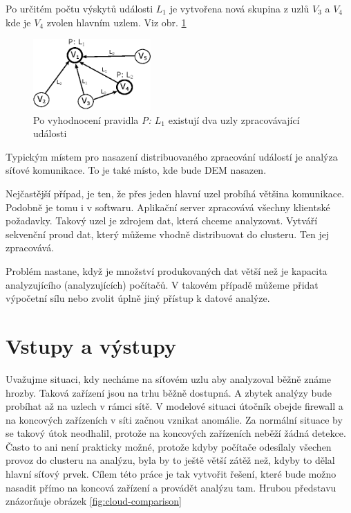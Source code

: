 \documentclass[
  digital, %
  table,   %
  nolof,     %
  nolot,     %
  oneside, %
  nocover,
  monochrome,
  12pt
]{fithesis3}
\begin{document}
Po určitém počtu výskytů události \textit{$L_1$} je vytvořena nová skupina z uzlů \textit{$V_3$} a \textit{$V_4$} kde je \textit{$V_4$} zvolen hlavním uzlem. Viz obr. \ref{fig:analysis_case_2}

\begin{figure}[H]
	\centering
    \includegraphics[width=0.4\textwidth, height=0.15\textheight]{images/analysis_case_2.eps}
    \caption{Po vyhodnocení pravidla \textit{P: $L_1$} existují dva uzly zpracovávající události}
    \label{fig:analysis_case_2}
\end{figure}

Typickým místem pro nasazení distribuovaného zpracování událostí je analýza síťové komunikace. To je také místo, kde bude DEM nasazen.

Nejčastější případ, je ten, že přes jeden hlavní uzel probíhá většina komunikace. Podobně je tomu i v softwaru. Aplikační server zpracovává všechny klientské požadavky. Takový uzel je zdrojem dat, která chceme analyzovat. Vytváří sekvenční proud dat, který můžeme vhodně distribuovat do clusteru. Ten jej zpracovává.

Problém nastane, když je množství produkovaných dat větší než je kapacita analyzujícího (analyzujících) počítačů. V takovém případě můžeme přidat výpočetní sílu nebo zvolit úplně jiný přístup k datové analýze.

\section{Vstupy a výstupy}
Uvažujme situaci, kdy necháme na síťovém uzlu aby analyzoval běžně známe hrozby. Taková zařízení jsou na trhu běžně dostupná. A zbytek analýzy bude probíhat až na uzlech v rámci sítě. V modelové situaci útočník obejde firewall a na koncových zařízeních v síti začnou vznikat anomálie. Za normální situace by se takový útok neodhalil, protože na koncových zařízeních neběží žádná detekce. Často to ani není prakticky možné, protože kdyby počítače odesílaly všechen provoz do clusteru na analýzu, byla by to ještě větší zátěž než, kdyby to dělal hlavní síťový prvek. Cílem této práce je tak vytvořit řešení, které bude možno nasadit přímo na koncová zařízení a provádět analýzu tam. Hrubou představu znázorňuje obrázek \ref{fig:cloud-comparison}
\end{document}
